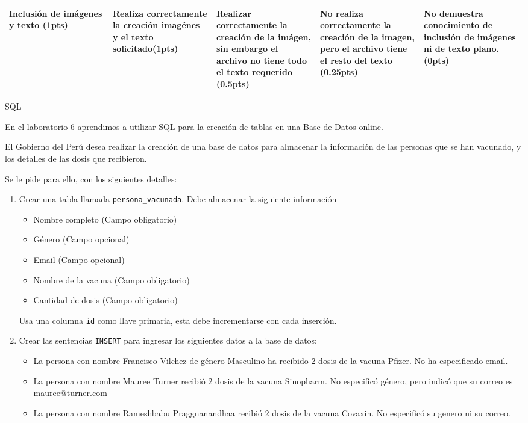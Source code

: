\documentclass[12pt]{exam}
\begin{document}
\begin{questions}
\begin{table}[h]
{\begin{tabular}{|p{0.2\linewidth}|p{0.2\linewidth}|p{0.2\linewidth}|p{0.2\linewidth}|p{0.2\linewidth}|}
    Inclusión de imágenes y texto (1pts) &
    Realiza correctamente la creación imagénes y el texto solicitado\textbf{(1pts)} &
    Realizar correctamente la creación de la imágen, sin embargo el archivo no tiene todo el texto requerido \textbf{(0.5pts)} &
    No realiza correctamente la creación de la imagen, pero el archivo tiene el resto del texto \textbf{(0.25pts)} &
    No demuestra conocimiento de inclusión de imágenes ni de texto plano. \textbf{(0pts)}\\
    
    \hline

    \end{tabular}
  }
\end{table}

\newpage

\question[5] SQL

En el laboratorio 6 aprendimos a utilizar SQL para la creación de tablas en una \href{https://extendsclass.com/mysql-online.html}{Base de Datos online}.

El Gobierno del Perú desea realizar la creación de una base de datos para almacenar la información de las personas que se han vacunado, y los detalles de las dosis que recibieron.

Se le pide para ello, con los siguientes detalles:

\begin{enumerate}
  \item Crear una tabla llamada \lstinline{persona_vacunada}. Debe almacenar la siguiente información
  
  \begin{itemize}
    \item Nombre completo (Campo obligatorio)
    \item Género (Campo opcional)
    \item Email (Campo opcional)
    \item Nombre de la vacuna (Campo obligatorio)
    \item Cantidad de dosis (Campo obligatorio)
  \end{itemize}

  Usa una columna \lstinline{id} como llave primaria, esta debe incrementarse con cada inserción.

  \item Crear las sentencias \lstinline{INSERT} para ingresar los siguientes datos a la base de datos:
  
  \begin{itemize}
    \item La persona con nombre Francisco Vilchez de género Masculino ha recibido 2 dosis de la vacuna Pfizer. No ha especificado email.
    \item La persona con nombre Mauree Turner recibió 2 dosis de la vacuna Sinopharm. No especificó género, pero indicó que su correo es mauree@turner.com
    \item La persona con nombre Rameshbabu Praggnanandhaa recibió 2 dosis de la vacuna Covaxin. No especificó su genero ni su correo.


\end{itemize}
\end{enumerate}
\end{questions}
\end{document}
